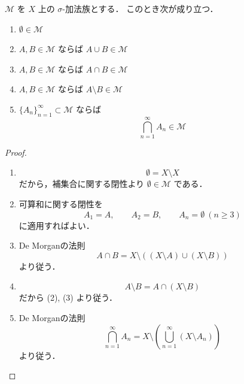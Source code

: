 \begin{proposition}[基本性質]
$\mathcal M$ を $X$ 上の $\sigma$-加法族とする．
このとき次が成り立つ．
\begin{enumerate}
    \item $\emptyset \in \mathcal M$
    \item $A,B \in \mathcal M$ ならば $A \cup B \in \mathcal M$
    \item $A,B \in \mathcal M$ ならば $A \cap B \in \mathcal M$
    \item $A,B \in \mathcal M$ ならば $A \setminus B \in \mathcal M$
    \item $\{A_n\}_{n=1}^{\infty} \subset \mathcal M$ ならば
    \[
    \bigcap_{n=1}^{\infty} A_n \in \mathcal M
    \]
\end{enumerate}
\end{proposition}
\begin{proof}
\begin{enumerate}
    \item
    \[
    \emptyset = X \setminus X
    \]
    だから，補集合に関する閉性より $\emptyset \in \mathcal M$ である．

    \item 可算和に関する閉性を
    \[
    A_1=A,\qquad A_2=B,\qquad A_n=\emptyset\ (n\ge 3)
    \]
    に適用すればよい．

    \item De Morganの法則
    \[
    A \cap B = X \setminus ((X \setminus A)\cup(X \setminus B))
    \]
    より従う．

    \item
    \[
    A\setminus B=A\cap(X\setminus B)
    \]
    だから (2), (3) より従う．

    \item De Morganの法則
    \[
    \bigcap_{n=1}^{\infty}A_n
    =
    X\setminus\left(\bigcup_{n=1}^{\infty}(X\setminus A_n)\right)
    \]
    より従う．
\end{enumerate}
\end{proof}


